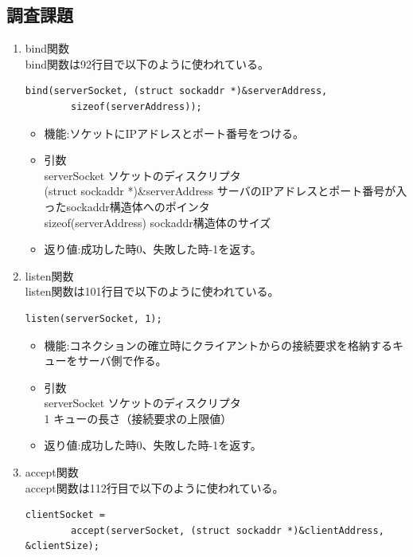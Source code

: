 \documentclass[a4j]{celb-report}
\begin{document}
\subsection{調査課題}
\begin{enumerate}
 \renewcommand{\labelenumi}{(\arabic{enumi})}
 \item bind関数\\
bind関数は92行目で以下のように使われている。
  \begin{lstlisting}[basicstyle=\ttfamily\footnotesize, frame=single]
    bind(serverSocket, (struct sockaddr *)&serverAddress, 
        sizeof(serverAddress));
  \end{lstlisting}
  \begin{itemize}
   \item 機能:ソケットにIPアドレスとポート番号をつける。
   \item 引数\\
serverSocket ソケットのディスクリプタ\\
(struct sockaddr *)\&serverAddress サーバのIPアドレスとポート番号が入ったsockaddr構造体へのポインタ\\
sizeof(serverAddress) sockaddr構造体のサイズ
   \item 返り値:成功した時0、失敗した時-1を返す。
  \end{itemize}
 \item listen関数\\
listen関数は101行目で以下のように使われている。
  \begin{lstlisting}[basicstyle=\ttfamily\footnotesize, frame=single]
   listen(serverSocket, 1);
  \end{lstlisting}
  \begin{itemize}
   \item 機能:コネクションの確立時にクライアントからの接続要求を格納するキューをサーバ側で作る。
   \item 引数\\
serverSocket ソケットのディスクリプタ\\
1 キューの長さ（接続要求の上限値）
   \item 返り値:成功した時0、失敗した時-1を返す。
  \end{itemize}
 \item accept関数\\
accept関数は112行目で以下のように使われている。
  \begin{lstlisting}[basicstyle=\ttfamily\footnotesize, frame=single]
      clientSocket = 
        accept(serverSocket, (struct sockaddr *)&clientAddress, &clientSize);

\end{lstlisting}
\end{enumerate}
\end{document}
